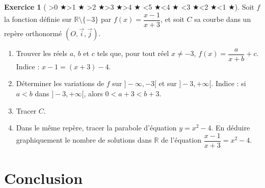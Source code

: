 \documentclass[12pt,a4paper]{article}
\newcommand{\diff}[1]{%
  \textcolor{orange!80!black}{\ifnum#1>0 $\bigstar$\fi\ifnum#1>1 $\bigstar$\fi
  \ifnum#1>2 $\bigstar$\fi\ifnum#1>3 $\bigstar$\fi\ifnum#1>4 $\bigstar$\fi}%
  \textcolor{gray!40}{\ifnum#1<5 $\bigstar$\fi\ifnum#1<4 $\bigstar$\fi
  \ifnum#1<3 $\bigstar$\fi\ifnum#1<2 $\bigstar$\fi\ifnum#1<1 $\bigstar$\fi}}
\theoremstyle{plain}
\theoremstyle{definition}
\newtheorem{exercise}{Exercice}
\theoremstyle{remark}
\begin{document}
\begin{exercise}[\diff{4}]
Soit $f$ la fonction définie sur $\mathbb{R} \setminus \{-3\}$ par
$f(x) = \dfrac{x - 1}{x + 3}$, et soit $C$ sa courbe dans un repère orthonormé
$(O, \vec{i}, \vec{j})$.
\begin{enumerate}[label=\alph*)]
  \item Trouver les réels $a$, $b$ et $c$ tels que, pour tout réel $x \neq -3$,
  $f(x) = \dfrac{a}{x + b} + c$. Indice : $x - 1 = (x + 3) - 4$.
  \item Déterminer les variations de $f$ sur $]-\infty, -3[$ et sur $]-3, +\infty[$.
  Indice : si $a < b$ dans $]-3, +\infty[$, alors $0 < a + 3 < b + 3$.
  \item Tracer $C$.
  \item Dans le même repère, tracer la parabole d'équation $y = x^2 - 4$. En déduire
  graphiquement le nombre de solutions dans $\mathbb{R}$ de l'équation
  $\dfrac{x - 1}{x + 3} = x^2 - 4$.
\end{enumerate}
\label{ex:rational_function}
\end{exercise}

\newpage
{}
\section*{Conclusion}
\end{document}
